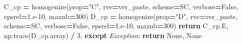 \documentclass[
  a4paper,
  numbers=noendperiod,
  DIV=12]{scrreprt}
\newenvironment{Shaded}{\begin{snugshade}}{\end{snugshade}}
\newcommand{\ControlFlowTok}[1]{\textcolor[rgb]{0.13,0.29,0.53}{\textbf{#1}}}
\newcommand{\DecValTok}[1]{\textcolor[rgb]{0.00,0.00,0.81}{#1}}
\newcommand{\FloatTok}[1]{\textcolor[rgb]{0.00,0.00,0.81}{#1}}
\newcommand{\NormalTok}[1]{#1}
\newcommand{\OperatorTok}[1]{\textcolor[rgb]{0.81,0.36,0.00}{\textbf{#1}}}
\newcommand{\PreprocessorTok}[1]{\textcolor[rgb]{0.56,0.35,0.01}{\textit{#1}}}
\newcommand{\StringTok}[1]{\textcolor[rgb]{0.31,0.60,0.02}{#1}}
\newcommand{\VariableTok}[1]{\textcolor[rgb]{0.00,0.00,0.00}{#1}}
\begin{document}
\begin{Shaded}
\begin{Highlighting}[]
\NormalTok{        C\_cp }\OperatorTok{=}\NormalTok{ homogenize(prop}\OperatorTok{=}\StringTok{"C"}\NormalTok{, rve}\OperatorTok{=}\NormalTok{ver\_paste, scheme}\OperatorTok{=}\NormalTok{SC,}
\NormalTok{                          verbose}\OperatorTok{=}\VariableTok{False}\NormalTok{, epsrel}\OperatorTok{=}\FloatTok{1.e{-}10}\NormalTok{, maxnb}\OperatorTok{=}\DecValTok{300}\NormalTok{)}
\NormalTok{        D\_cp }\OperatorTok{=}\NormalTok{ homogenize(prop}\OperatorTok{=}\StringTok{"D"}\NormalTok{, rve}\OperatorTok{=}\NormalTok{ver\_paste, scheme}\OperatorTok{=}\NormalTok{SC,}
\NormalTok{                          verbose}\OperatorTok{=}\VariableTok{False}\NormalTok{, epsrel}\OperatorTok{=}\FloatTok{1.e{-}10}\NormalTok{, maxnb}\OperatorTok{=}\DecValTok{300}\NormalTok{)}
        \ControlFlowTok{return}\NormalTok{ C\_cp.E, np.trace(D\_cp.array) }\OperatorTok{/} \FloatTok{3.}
    \ControlFlowTok{except} \PreprocessorTok{Exception}\NormalTok{:}
        \ControlFlowTok{return} \VariableTok{None}\NormalTok{, }\VariableTok{None}
\end{Highlighting}
\end{Shaded}
\end{document}
